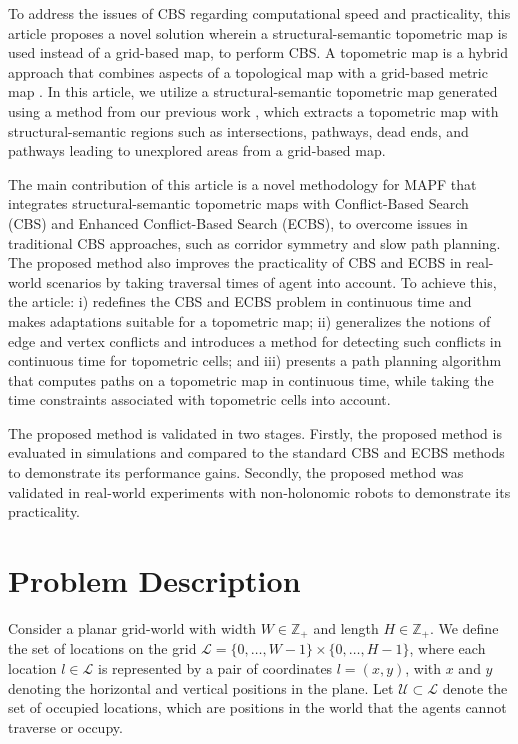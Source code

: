 \documentclass[letterpaper, 10 pt, conference]{ieeeconf}  %
\begin{document}
To address the issues of CBS regarding computational speed and practicality, this article proposes a novel solution wherein a structural-semantic topometric map is used instead of a grid-based map, to perform CBS. A topometric map is a hybrid approach that combines aspects of a topological map \cite{Remolina2004} with a grid-based metric map \cite{Kostavelis2015}. 
In this article, we utilize a structural-semantic topometric map generated using a method from our previous work \cite{FREDRIKSSON_SEMANTIC_MAPPING}, which extracts a topometric map with structural-semantic regions such as intersections, pathways, dead ends, and pathways leading to unexplored areas from a grid-based map.

The main contribution of this article is a novel methodology for MAPF that integrates structural-semantic topometric maps with Conflict-Based Search (CBS) and Enhanced Conflict-Based Search (ECBS), to overcome issues in traditional CBS approaches, such as corridor symmetry and slow path planning. The proposed method also improves the practicality of CBS and ECBS in real-world scenarios by taking traversal times of agent into account. To achieve this, the article: i) redefines the CBS and ECBS problem in continuous time and makes adaptations suitable for a topometric map; ii) generalizes the notions of edge and vertex conflicts and introduces a method for detecting such conflicts in continuous time for topometric cells; and iii) presents a path planning algorithm that computes paths on a topometric map in continuous time, while taking the time constraints associated with topometric cells into account.

The proposed method is validated in two stages.
Firstly, the proposed method is evaluated in simulations and compared to the standard CBS and ECBS methods to demonstrate its performance gains. Secondly, the proposed method was validated in real-world experiments with non-holonomic robots to demonstrate its practicality.

\section{Problem Description}
Consider a planar grid-world with width $W \in \mathbb{Z_+}$ and length $H \in \mathbb{Z_+}$. We define the set of locations on the grid $\mathcal{L}=\{0, \ldots, W-1\} \times\{0, \ldots, H-1\}$, where each location $l\in \mathcal{L}$ is represented by a pair of coordinates $l=(x, y)$, with $x$ and $y$ denoting the horizontal and vertical positions in the plane. Let $\mathcal{U} \subset \mathcal{L}$ denote the set of occupied locations, which are positions in the world that the agents cannot traverse or occupy. 
\end{document}
